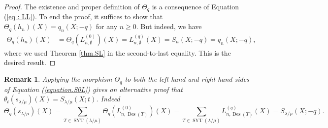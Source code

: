 \documentclass[revision]{FPSAC2024}
\newtheorem{remark}{Remark}
\newcommand{\la}{\lambda}
\newcommand{\SYT}{\operatorname{SYT}}
\newcommand{\Des}{\operatorname{Des}}
\begin{document}
\begin{proof}
The existence and proper definition of $\Theta_q$ is a consequence of Equation (\ref{eq : LL}). To end the proof, it suffices to show that $\Theta_q(h_n)(X) = q_n(X;-q)$ for any $n \geq 0$.
But indeed, we have
\begin{align*}
\Theta_q(h_n)(X) %
&= \Theta_q(L^{(0)}_{n, \emptyset})(X)
= L^{(q)}_{n, \emptyset}(X) = S_n(X;-q)
= q_n(X;-q),
\end{align*}
where we used Theorem \ref{thm.SL} in the second-to-last equality.
This is the desired result. 
\end{proof}
\begin{remark}
Applying the morphism $\Theta_q$ to both the left-hand and right-hand sides of Equation (\ref{equation.S0L}) gives an alternative proof that $\theta_{t}\left(s_{\la/\mu}\right)(X) = S_{\la/\mu}(X;t)$. Indeed
\begin{equation*}
\Theta_q \left (s_{\la/\mu} \right)(X) = \sum_{T \in \SYT(\la/\mu)}\Theta_q \left (L^{(0)}_{n, \Des(T)} \right)(X) = \sum_{T \in \SYT(\la/\mu)}L^{(q)}_{n, \Des(T)}(X) = S_{\la/\mu}(X; -q).
\end{equation*}
\end{remark}
%
\end{document}
